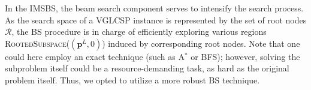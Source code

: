 \documentclass[runningheads]{llncs}
\begin{document}
In the IMSBS, the beam search component serves to intensify the search process. As the search space of a VGLCSP instance is represented by the set of root nodes $\mathcal{R}$, the BS procedure is in charge of efficiently exploring various  regions \textsc{RootedSubspace}($(\mathbf{p}^L, 0)$) induced by corresponding root nodes. Note that one could here employ an exact technique (such as A$^*$ or BFS); however, solving the subproblem itself could be a resource-demanding task, as hard as the original problem itself. Thus, we opted to utilize a more robust BS technique.  

 
\end{document}
